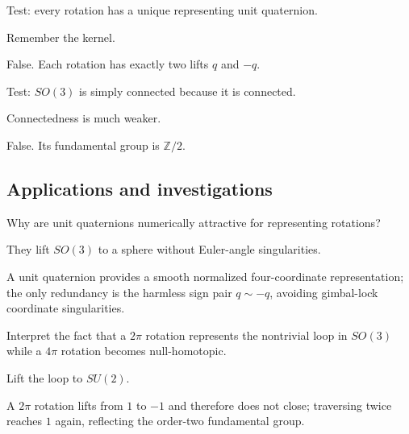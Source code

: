 \begin{exercise}\label{exr:viii13-ped-11}
Test: every rotation has a unique representing unit quaternion.
\end{exercise}
\begin{hint}
Remember the kernel.
\end{hint}
\begin{solution}
False. Each rotation has exactly two lifts $q$ and $-q$.
\end{solution}

\begin{exercise}\label{exr:viii13-ped-12}
Test: $SO(3)$ is simply connected because it is connected.
\end{exercise}
\begin{hint}
Connectedness is much weaker.
\end{hint}
\begin{solution}
False. Its fundamental group is $\mathbb Z/2$.
\end{solution}

\subsection*{Applications and investigations}

\begin{exercise}\label{exr:viii13-ped-13}
Why are unit quaternions numerically attractive for representing rotations?
\end{exercise}
\begin{hint}
They lift $SO(3)$ to a sphere without Euler-angle singularities.
\end{hint}
\begin{solution}
A unit quaternion provides a smooth normalized four-coordinate representation; the only redundancy is the harmless sign pair $q\sim -q$, avoiding gimbal-lock coordinate singularities.
\end{solution}

\begin{exercise}\label{exr:viii13-ped-14}
Interpret the fact that a $2\pi$ rotation represents the nontrivial loop in $SO(3)$ while a $4\pi$ rotation becomes null-homotopic.
\end{exercise}
\begin{hint}
Lift the loop to $SU(2)$.
\end{hint}
\begin{solution}
A $2\pi$ rotation lifts from $1$ to $-1$ and therefore does not close; traversing twice reaches $1$ again, reflecting the order-two fundamental group.
\end{solution}

